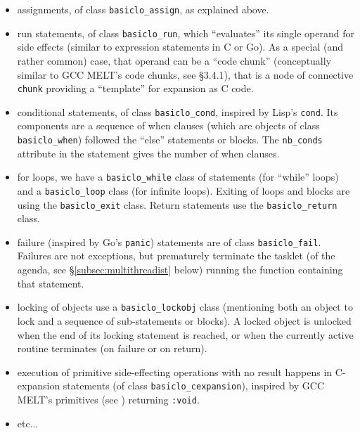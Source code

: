 \begin{itemize}
\item assignments, of class \texttt{basiclo\_assign}, as explained above.
  
  \item run statements, of class \texttt{basiclo\_run}, which
    ``evaluates'' its single operand for side effects (similar to
    expression statements in C or Go). As a special (and rather
    common) case, that operand can be a ``code chunk'' (conceptually
    similar to GCC MELT's code chunks, see
    \cite{Starynkevitch-DSL2011} §3.4.1), that is a node of connective
    \texttt{chunk} providing a ``template'' for expansion as C code.

    \item conditional statements, of class \texttt{basiclo\_cond},
      inspired by Lisp's \texttt{cond}. Its components are a sequence
      of when clauses (which are objects of class
      \texttt{basiclo\_when}) followed the ``else'' statements or
      blocks. The \texttt{nb\_conds} attribute in the statement gives
      the number of when clauses.

    \item for loops, we have a \texttt{basiclo\_while} class of
      statements (for ``while'' loops) and a \texttt{basiclo\_loop}
      class (for infinite loops). Exiting of loops and blocks are
      using the \texttt{basiclo\_exit} class. Return statements use
      the \texttt{basiclo\_return} class.

      \item failure (inspired by Go's \texttt{panic}) statements are
        of class \texttt{basiclo\_fail}. Failures are not exceptions,
        but prematurely terminate the tasklet (of the agenda, see
        §\ref{subsec:multithreadist} below) running the function
        containing that statement.

      \item locking of objects use a \texttt{basiclo\_lockobj} class
        (mentioning both an object to lock and a sequence of
        sub-statements or blocks). A locked object is unlocked when
        the end of its locking statement is reached, or when the
        currently active routine terminates (on failure or on return).

      \item execution of primitive side-effecting operations with no
        result happens in C-expansion statements (of class
          \texttt{basiclo\_cexpansion}), inspired by GCC MELT's
          primitives (see \cite{Starynkevitch-DSL2011}) returning
          \texttt{:void}.

      \item etc...
\end{itemize}

